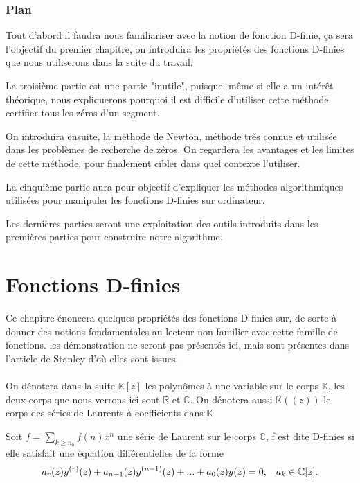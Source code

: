 \documentclass[a4paper,10.5pt]{article}
\begin{document}
	\subsubsection{Plan}
	
	Tout d'abord il faudra nous familiariser avec la notion de fonction D-finie, ça sera l'objectif du premier chapitre, on introduira les propriétés des fonctions D-finies que nous utiliserons dans la suite du travail.
	
	La troisième partie est une partie "inutile", puisque, même si elle a un intérêt théorique, nous expliquerons pourquoi il est difficile d'utiliser cette méthode certifier tous les zéros d'un segment.
	
	On introduira ensuite, la méthode de Newton, méthode très connue et utilisée dans les problèmes de recherche de zéros. On regardera les avantages et les limites de cette méthode, pour finalement cibler dans quel contexte l'utiliser.
	
	La cinquième partie aura pour objectif d'expliquer les méthodes algorithmiques utilisées pour manipuler les fonctions D-finies sur ordinateur.
	
	Les dernières parties seront une exploitation des outils introduits dans les premières parties pour construire notre algorithme. 
	
	
	\section{Fonctions D-finies}
	Ce chapitre énoncera quelques propriétés des fonctions D-finies sur, de sorte à donner des notions fondamentales au lecteur non familier avec cette famille de fonctions. les démonstration ne seront pas présentés ici, mais sont présentes dans l'article de Stanley d'où elles sont issues.\\
	\\
	On dénotera dans la suite $\mathbb{K}[z]$ les polynômes à une variable sur le corps $\mathbb{K}$, les deux corps que nous verrons ici sont $\mathbb{R}$ et $\mathbb{C}$. On dénotera aussi $\mathbb{K}((z))$ le corps des séries de Laurents à coefficients dans $\mathbb{K}$
	
	\begin{definition}
		Soit $f=\sum_{k\geq n_0}f(n)x^n$ une série de Laurent sur le corps $\mathbb{C}$, f est dite  D-finies si elle satisfait une équation différentielles de la forme
		\begin{equation}
		a_{r}(z)y^{(r)}(z)+a_{n-1}(z)y^{(n-1)}(z)+...+a_{0}(z)y(z)=0, \hspace{3mm} a_{k}\in \mathbb{C}[z].
		\end{equation}
	\end{definition}
	
\end{document}

